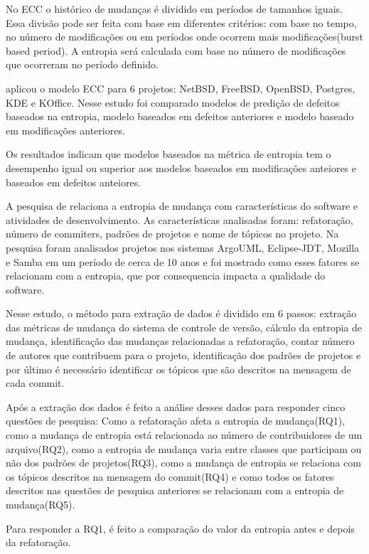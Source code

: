 No ECC o histórico de mudanças é dividido em períodos de tamanhos iguais. Essa divisão pode ser feita com base em diferentes critérios: com base no tempo, no número de modificações ou em períodos onde ocorrem mais modificações(burst based period). A entropia será calculada com base no número de modificações que ocorreram no período definido.

 aplicou o modelo ECC para 6 projetos: NetBSD, FreeBSD, OpenBSD, Postgres, KDE e KOffice. Nesse estudo foi comparado modelos de predição de defeitos baseados na entropia, modelo baseados em defeitos anteriores e modelo baseado em modificações anteriores.

Os resultados indicam que modelos baseados na métrica de entropia tem o desempenho igual ou superior aos modelos baseados em modificações anteiores e baseados em defeitos anteiores.

A pesquisa de  relaciona a entropia de mudança com características do software e atividades de desenvolvimento. As características analisadas foram: refatoração, número de commiters, padrões de projetos e nome de tópicos no projeto. Na pesquisa foram analisados projetos nos sistemas ArgoUML, Eclipse-JDT, Mozilla e Samba em um período de cerca de 10 anos e foi mostrado como esses fatores se relacionam com a entropia, que por consequencia impacta a qualidade do software.

Nesse estudo, o método para extração de dados é dividido em 6 passos: extração das métricas de mudança do sistema de controle de versão, cálculo da entropia de mudança, identificação das mudanças relacionadas a refatoração, contar número de autores que contribuem para o projeto, identificação dos padrões de projetos e por último é necessário identificar os tópicos que são descritos na mensagem de cada commit. 

Após a extração dos dados é feito a análise desses dados para responder cinco questões de pesquisa: Como a refatoração afeta a entropia de mudança(RQ1), como a mudança de entropia está relacionada ao número de contribuidores de um arquivo(RQ2), como a entropia de mudança varia entre classes que participam ou não dos padrões de projetos(RQ3), como a mudança de entropia se relaciona com os tópicos descritos na mensagem do commit(RQ4) e como todos os fatores descritos nas questões de pesquisa anteriores se relacionam com a entropia de mudança(RQ5). 

Para responder a RQ1, é feito a comparação do valor da entropia antes e depois da refatoração. 

